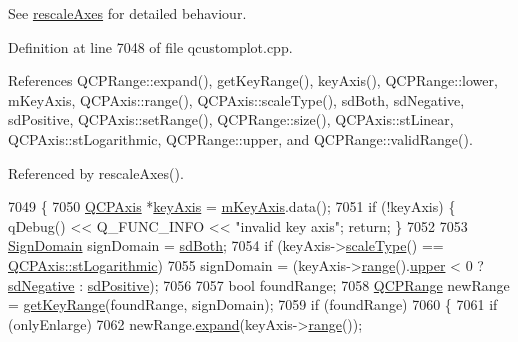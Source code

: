 See \hyperlink{class_q_c_p_abstract_plottable_a7e8fc3be43c27ccacd70a7bf9d74a5cd}{rescale\+Axes} for detailed behaviour. 

Definition at line 7048 of file qcustomplot.\+cpp.



References Q\+C\+P\+Range\+::expand(), get\+Key\+Range(), key\+Axis(), Q\+C\+P\+Range\+::lower, m\+Key\+Axis, Q\+C\+P\+Axis\+::range(), Q\+C\+P\+Axis\+::scale\+Type(), sd\+Both, sd\+Negative, sd\+Positive, Q\+C\+P\+Axis\+::set\+Range(), Q\+C\+P\+Range\+::size(), Q\+C\+P\+Axis\+::st\+Linear, Q\+C\+P\+Axis\+::st\+Logarithmic, Q\+C\+P\+Range\+::upper, and Q\+C\+P\+Range\+::valid\+Range().



Referenced by rescale\+Axes().


\begin{DoxyCode}
7049 \{
7050   \hyperlink{class_q_c_p_axis}{QCPAxis} *\hyperlink{class_q_c_p_abstract_plottable_a72c7a09c22963f2c943f07112b311103}{keyAxis} = \hyperlink{class_q_c_p_abstract_plottable_a426f42e254d0f8ce5436a868c61a6827}{mKeyAxis}.data();
7051   \textcolor{keywordflow}{if} (!keyAxis) \{ qDebug() << Q\_FUNC\_INFO << \textcolor{stringliteral}{"invalid key axis"}; \textcolor{keywordflow}{return}; \}
7052   
7053   \hyperlink{class_q_c_p_abstract_plottable_a661743478a1d3c09d28ec2711d7653d8}{SignDomain} signDomain = \hyperlink{class_q_c_p_abstract_plottable_a661743478a1d3c09d28ec2711d7653d8a082b98cfb91a7363a3b5cd17b0c1cd60}{sdBoth};
7054   \textcolor{keywordflow}{if} (keyAxis->\hyperlink{class_q_c_p_axis_a8563e13407bc0616da7f7c84e02de170}{scaleType}() == \hyperlink{class_q_c_p_axis_a36d8e8658dbaa179bf2aeb973db2d6f0abf5b785ad976618816dc6f79b73216d4}{QCPAxis::stLogarithmic})
7055     signDomain = (keyAxis->\hyperlink{class_q_c_p_axis_ab1ea79a4f5ea4cf42620f8f51c477ac4}{range}().\hyperlink{class_q_c_p_range_ae44eb3aafe1d0e2ed34b499b6d2e074f}{upper} < 0 ? \hyperlink{class_q_c_p_abstract_plottable_a661743478a1d3c09d28ec2711d7653d8a0fc9a70796ef60ad18ddd18056e6dc63}{sdNegative} : 
      \hyperlink{class_q_c_p_abstract_plottable_a661743478a1d3c09d28ec2711d7653d8a02951859f243a4d24e779cfbb5471030}{sdPositive});
7056   
7057   \textcolor{keywordtype}{bool} foundRange;
7058   \hyperlink{class_q_c_p_range}{QCPRange} newRange = \hyperlink{class_q_c_p_abstract_plottable_a345d702b2e7e12c8cfdddff65ba85e8c}{getKeyRange}(foundRange, signDomain);
7059   \textcolor{keywordflow}{if} (foundRange)
7060   \{
7061     \textcolor{keywordflow}{if} (onlyEnlarge)
7062       newRange.\hyperlink{class_q_c_p_range_a0fa1bc8048be50d52bea93a8caf08305}{expand}(keyAxis->\hyperlink{class_q_c_p_axis_ab1ea79a4f5ea4cf42620f8f51c477ac4}{range}());

\end{DoxyCode}
